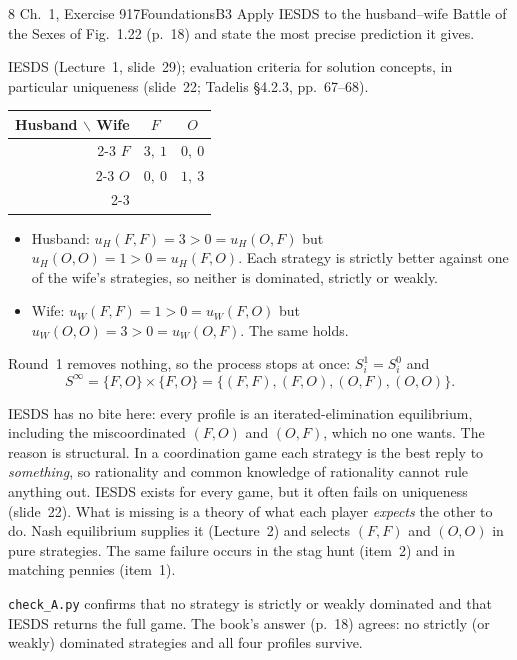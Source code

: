 \begin{exsol}{8}{\MG{} Ch.~1, Exercise 9}{17}{Foundations}{B3}
\asked Apply IESDS to the husband--wife Battle of the Sexes of Fig.~1.22 (p.~18) and state the
most precise prediction it gives.

\method IESDS (Lecture~1, slide~29); evaluation criteria for solution concepts, in particular
uniqueness (slide~22; Tadelis \S4.2.3, pp.~67--68).

\solution
\begin{center}
\begin{tabular}{r|c|c|}
\multicolumn{1}{r}{Husband $\backslash$ Wife} & \multicolumn{1}{c}{$F$} & \multicolumn{1}{c}{$O$}\\ \cline{2-3}
$F$ & $3,\ 1$ & $0,\ 0$ \\ \cline{2-3}
$O$ & $0,\ 0$ & $1,\ 3$ \\ \cline{2-3}
\end{tabular}
\end{center}
\begin{itemize}
  \item Husband: $u_H(F,F) = 3 > 0 = u_H(O,F)$ but $u_H(O,O) = 1 > 0 = u_H(F,O)$. Each strategy
  is strictly better against one of the wife's strategies, so neither is dominated, strictly
  or weakly.
  \item Wife: $u_W(F,F) = 1 > 0 = u_W(F,O)$ but $u_W(O,O) = 3 > 0 = u_W(O,F)$. The same holds.
\end{itemize}
Round~1 removes nothing, so the process stops at once: $S_i^1 = S_i^0$ and
\[
  S^\infty = \{F, O\} \times \{F, O\} = \{(F,F), (F,O), (O,F), (O,O)\}.
\]

\interp IESDS has no bite here: every profile is an iterated-elimination equilibrium,
including the miscoordinated $(F,O)$ and $(O,F)$, which no one wants. The reason is
structural. In a coordination game each strategy is the best reply to \emph{something}, so
rationality and common knowledge of rationality cannot rule anything out. IESDS exists for every
game, but it often fails on uniqueness (slide~22). What is missing is a theory of what each
player \emph{expects} the other to do. Nash equilibrium supplies it (Lecture~2) and selects
$(F,F)$ and $(O,O)$ in pure strategies. The same failure occurs in the stag hunt (item~2) and in
matching pennies (item~1).

\verify \texttt{check\_A.py} confirms that no strategy is strictly or weakly dominated and
that IESDS returns the full game. The book's answer (p.~18) agrees: no strictly (or weakly)
dominated strategies and all four profiles survive.

\end{exsol}
